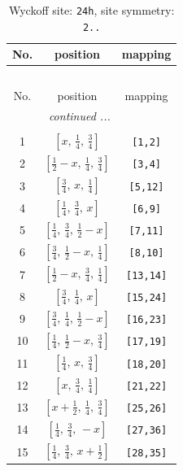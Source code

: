 \documentclass[fleqn,8pt]{jsarticle}
\begin{document}
\begin{longtable}{ccc}
\caption{Wyckoff site: {\tt 24h}, site symmetry: {\tt 2..}}
 \\
 \hline \hline
No. & position & mapping \\ \hline \endfirsthead

\multicolumn{2}{l}{\tablename\ \thetable{}} \\
 \hline \hline
No. & position & mapping \\ \hline \endhead

 \hline \hline
\multicolumn{2}{r}{\footnotesize\it continued ...} \\ \endfoot

 \hline \hline
\multicolumn{2}{r}{} \\ \endlastfoot

1 & $\left[ x,\, \frac{1}{4},\, \frac{3}{4} \right]$ & {\tt [1,2]} \\ \hline
2 & $\left[ \frac{1}{2} - x,\, \frac{1}{4},\, \frac{3}{4} \right]$ & {\tt [3,4]} \\ \hline
3 & $\left[ \frac{3}{4},\, x,\, \frac{1}{4} \right]$ & {\tt [5,12]} \\ \hline
4 & $\left[ \frac{1}{4},\, \frac{3}{4},\, x \right]$ & {\tt [6,9]} \\ \hline
5 & $\left[ \frac{1}{4},\, \frac{3}{4},\, \frac{1}{2} - x \right]$ & {\tt [7,11]} \\ \hline
6 & $\left[ \frac{3}{4},\, \frac{1}{2} - x,\, \frac{1}{4} \right]$ & {\tt [8,10]} \\ \hline
7 & $\left[ \frac{1}{2} - x,\, \frac{3}{4},\, \frac{1}{4} \right]$ & {\tt [13,14]} \\ \hline
8 & $\left[ \frac{3}{4},\, \frac{1}{4},\, x \right]$ & {\tt [15,24]} \\ \hline
9 & $\left[ \frac{3}{4},\, \frac{1}{4},\, \frac{1}{2} - x \right]$ & {\tt [16,23]} \\ \hline
10 & $\left[ \frac{1}{4},\, \frac{1}{2} - x,\, \frac{3}{4} \right]$ & {\tt [17,19]} \\ \hline
11 & $\left[ \frac{1}{4},\, x,\, \frac{3}{4} \right]$ & {\tt [18,20]} \\ \hline
12 & $\left[ x,\, \frac{3}{4},\, \frac{1}{4} \right]$ & {\tt [21,22]} \\ \hline
13 & $\left[ x + \frac{1}{2},\, \frac{1}{4},\, \frac{3}{4} \right]$ & {\tt [25,26]} \\ \hline
14 & $\left[ \frac{1}{4},\, \frac{3}{4},\, - x \right]$ & {\tt [27,36]} \\ \hline
15 & $\left[ \frac{1}{4},\, \frac{3}{4},\, x + \frac{1}{2} \right]$ & {\tt [28,35]} \\ \hline

\end{longtable}
\end{document}
